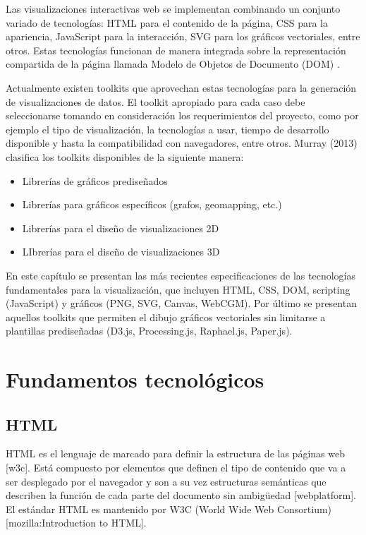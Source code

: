 Las visualizaciones interactivas web se implementan combinando un conjunto variado de tecnologías: HTML para el contenido de la página, CSS para la apariencia, JavaScript para la interacción, SVG para los gráficos vectoriales, entre otros. Estas tecnologías funcionan de manera integrada sobre la representación compartida de la página llamada Modelo de Objetos de Documento (DOM) \cite{Bostock2011a}.

Actualmente existen toolkits que aprovechan estas tecnologías para la generación de visualizaciones de datos. El toolkit apropiado para cada caso debe seleccionarse tomando en consideración los requerimientos del proyecto, como por ejemplo el tipo de visualización, la tecnologías a usar, tiempo de desarrollo disponible y hasta la compatibilidad con navegadores, entre otros. Murray (2013) clasifica los toolkits disponibles de la siguiente manera:

\begin{itemize}
  \item Librerías de gráficos prediseñados
  \item Librerías para gráficos específicos (grafos, geomapping, etc.)
  \item Librerías para el diseño de visualizaciones 2D
  \item LIbrerías para el diseño de visualizaciones 3D
\end{itemize}

En este capítulo se presentan las más recientes especificaciones de las tecnologías fundamentales para la visualización, que incluyen HTML, CSS, DOM, scripting (JavaScript) y gráficos (PNG, SVG, Canvas, WebCGM). Por último se presentan aquellos toolkits que permiten el dibujo gráficos vectoriales sin limitarse a plantillas prediseñadas (D3.js, Processing.js, Raphael.js, Paper.js).

\section{Fundamentos tecnológicos}

\subsection{HTML}

HTML es el lenguaje de marcado para definir la estructura de las páginas web [w3c]. Está compuesto por elementos que definen el tipo de contenido que va a ser desplegado por el navegador y son a su vez estructuras semánticas que describen la función de cada parte del documento sin ambigüedad  [webplatform]. El estándar HTML es mantenido por W3C (World Wide Web Consortium) [mozilla:Introduction to HTML].

